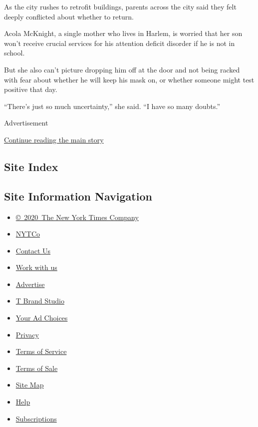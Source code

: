 As the city rushes to retrofit buildings, parents across the city said
they felt deeply conflicted about whether to return.

Acola McKnight, a single mother who lives in Harlem, is worried that her
son won't receive crucial services for his attention deficit disorder if
he is not in school.

But she also can't picture dropping him off at the door and not being
racked with fear about whether he will keep his mask on, or whether
someone might test positive that day.

``There's just so much uncertainty,'' she said. ``I have so many
doubts.''

Advertisement

\protect\hyperlink{after-bottom}{Continue reading the main story}

\hypertarget{site-index}{%
\subsection{Site Index}\label{site-index}}

\hypertarget{site-information-navigation}{%
\subsection{Site Information
Navigation}\label{site-information-navigation}}

\begin{itemize}
\tightlist
\item
  \href{https://help.nytimes3xbfgragh.onion/hc/en-us/articles/115014792127-Copyright-notice}{©~2020~The
  New York Times Company}
\end{itemize}

\begin{itemize}
\tightlist
\item
  \href{https://www.nytco.com/}{NYTCo}
\item
  \href{https://help.nytimes3xbfgragh.onion/hc/en-us/articles/115015385887-Contact-Us}{Contact
  Us}
\item
  \href{https://www.nytco.com/careers/}{Work with us}
\item
  \href{https://nytmediakit.com/}{Advertise}
\item
  \href{http://www.tbrandstudio.com/}{T Brand Studio}
\item
  \href{https://www.nytimes3xbfgragh.onion/privacy/cookie-policy\#how-do-i-manage-trackers}{Your
  Ad Choices}
\item
  \href{https://www.nytimes3xbfgragh.onion/privacy}{Privacy}
\item
  \href{https://help.nytimes3xbfgragh.onion/hc/en-us/articles/115014893428-Terms-of-service}{Terms
  of Service}
\item
  \href{https://help.nytimes3xbfgragh.onion/hc/en-us/articles/115014893968-Terms-of-sale}{Terms
  of Sale}
\item
  \href{https://spiderbites.nytimes3xbfgragh.onion}{Site Map}
\item
  \href{https://help.nytimes3xbfgragh.onion/hc/en-us}{Help}
\item
  \href{https://www.nytimes3xbfgragh.onion/subscription?campaignId=37WXW}{Subscriptions}
\end{itemize}
